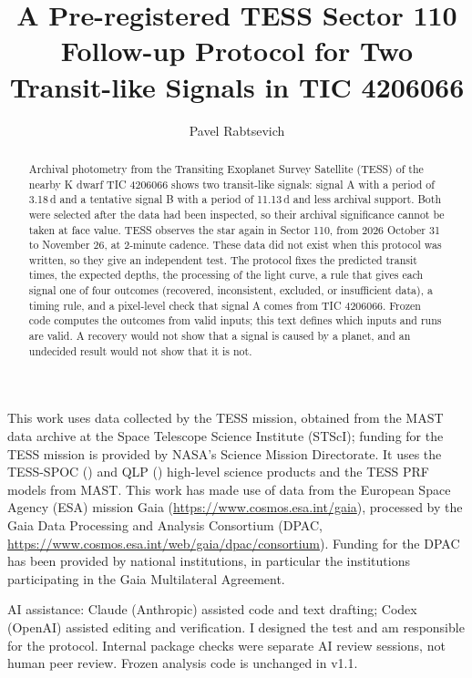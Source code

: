 \documentclass{aastex702}
\renewcommand{\_}{\origunderscore\allowbreak}
\begin{document}
\title{A Pre-registered TESS Sector 110 Follow-up Protocol for Two Transit-like Signals in TIC 4206066}

\author[gname=Pavel,sname=Rabtsevich]{Pavel Rabtsevich}

\begin{abstract}
Archival photometry from the Transiting Exoplanet Survey Satellite (TESS) of the nearby K dwarf TIC 4206066 shows two
transit-like signals: signal A with a period of 3.18\,d and a tentative signal B with a period of 11.13\,d and less archival support.
Both were selected after the data had been inspected, so their archival significance cannot be taken at face value.
TESS observes the star again in Sector 110, from 2026 October 31 to November 26, at 2-minute cadence. These data did not
exist when this protocol was written, so they give an independent test. The protocol fixes the predicted transit
times, the expected depths, the processing of the light curve, a rule that gives each signal one of four outcomes
(recovered, inconsistent, excluded, or insufficient data), a timing rule, and a pixel-level check that signal A comes
from TIC 4206066. Frozen code computes the outcomes from valid inputs; this text defines which inputs and runs are
valid. A recovery would not show that a signal is caused by a planet, and an undecided result would not show that it
is not.
\end{abstract}










\begin{acknowledgments}
This work uses data collected by the TESS mission, obtained from the MAST data archive at the Space Telescope Science
Institute (STScI); funding for the TESS mission is provided by NASA's Science Mission Directorate. It uses the TESS-SPOC
() and QLP () high-level science products and the TESS PRF
models from MAST. This work has made use of data from the European Space Agency (ESA) mission Gaia
(\url{https://www.cosmos.esa.int/gaia}), processed by the Gaia Data Processing and Analysis Consortium (DPAC,
\url{https://www.cosmos.esa.int/web/gaia/dpac/consortium}). Funding for the DPAC has been provided by national
institutions, in particular the institutions participating in the Gaia Multilateral Agreement.

AI assistance: Claude (Anthropic) assisted code and text drafting; Codex (OpenAI) assisted editing and
verification. I designed the test and am responsible for the protocol. Internal package checks were separate
AI review sessions, not human peer review. Frozen analysis code is unchanged in v1.1.
\end{acknowledgments}
\end{document}
